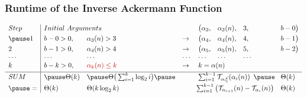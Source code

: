 \begin{frame}
\frametitle{Runtime of the Inverse Ackermann Function}

\begin{equation*}
\begin{array}{l|llllllll}
Step & \multicolumn{2}{l}{Initial \ Arguments} &  &  \big(\alpha_3, & \alpha_3(n), & 3, & b - 0 \big) \\[3pt]
\pause 1 & b - 0 > 0, & \alpha_3(n) > 3 & \to & \big(\alpha_4, & \alpha_4(n), & 4, & b - 1\big) \\[3pt]
2 & b - 1 > 0, & \alpha_4(n) > 4 & \to  & \big(\alpha_5, & \alpha_5(n), & 5, & b - 2\big) \\
\cdots & \cdots &\cdots & \cdots & \cdots & \cdots & \cdots \\
k & b - k > 0, & {\color{red} \alpha_{k}(n) \le k} & \to  & \multicolumn{4}{l}{k = \alpha(n)} \\[3pt] \hline
SUM & \pause \Theta(k) & \pause \Theta\big(\sum_{i=1}^{k}\log_2i\big) \pause & & \multicolumn{3}{r}{\sum_{i=1}^{k-1} \runtime_{\cdt{\alpha_i}{1}} (\alpha_i(n))} \pause & \Theta(k) \\[3pt]
\pause = & \Theta(k) & \Theta(k\log_2k) & \multicolumn{4}{r}{\sum_{i=1}^{k-1} \big(\runtime_{\alpha_{i+1}}(n) - \runtime_{\alpha_i}(n) \big)} & \Theta(k)
\end{array}
\end{equation*}

\smallskip

\pause 
{}

\end{frame}

